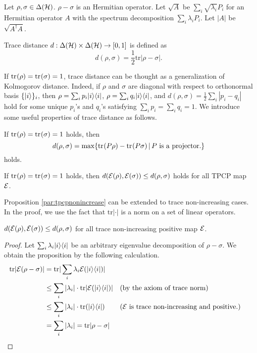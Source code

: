 Let $\rho, \sigma \in \Delta(\mathcal{H})$. $\rho - \sigma$ is an Hermitian
operator. Let $\sqrt{A}$ be $\sum_i \sqrt{\lambda_i}P_i$ for
an Hermitian operator $A$ with the spectrum decomposition
$\sum_i \lambda_i P_i$. Let $|A|$ be $\sqrt{A^\dagger A}$.

\begin{defi}
 Trace distance $d: \Delta(\mathcal{H}) \times \Delta(\mathcal{H}) \rightarrow [0,1]$ is
 defined as 
\[
 d(\rho, \sigma) = \frac{1}{2}\mathrm{tr}|\rho - \sigma|.
\]
\end{defi}
If ${\rm tr}_{}(\rho) = {\rm tr}_{}(\sigma) = 1$, trace distance can be thought as
a generalization of Kolmogorov distance.
Indeed, if $\rho$ and $\sigma$ are diagonal with respect to
orthonormal basis
$\{|i\rangle\}_{i}$, then $\rho = \sum_i p_i |i\rangle\langle i|$,
$\rho = \sum_i q_i |i\rangle\langle i|$, and $d(\rho,\sigma) = 
\frac{1}{2}\sum_i |p_i - q_i|$ hold for some unique $p_i$'s and $q_i$'s
satisfying $\sum_i p_i = \sum_i q_i = 1$.
We introduce some useful properties of trace distance as follows.

\begin{prop}
\label{par:trdismax}
 If ${\rm tr}_{}(\rho) = {\rm tr}_{}(\sigma) = 1$ holds, then 
\[
 d(\rho, \sigma) = 
 \max\{{\rm tr}_{}(P\rho) - {\rm tr}_{}(P\sigma)\,|\, P \mbox{ is a projector.}\}
\]
holds.
\end{prop}

\begin{prop}
\label{par:tpcpnonincrease}
If ${\rm tr}_{}(\rho) = {\rm tr}_{}(\sigma) = 1$ holds, then
 $d(\mathcal{E}(\rho), \mathcal{E}(\sigma))
\le d(\rho, \sigma)$ holds for all TPCP map $\mathcal{E}$.
\end{prop}
Proposition \ref{par:tpcpnonincrease}
can be extended to trace non-increasing cases.
In the proof, we use the fact that $\mathrm{tr}|\cdot|$ is a
norm on a set of linear operators.

\begin{prop}
\label{par:positivenonincrease}
 $d(\mathcal{E}(\rho), \mathcal{E}(\sigma)) \le d(\rho, \sigma)$ for all
 trace non-increasing positive map $\mathcal{E}$.
\end{prop}

\begin{proof}
 Let $\sum_i \lambda_i |i\rangle\langle i|$ be an arbitrary eigenvalue
 decomposition of $\rho - \sigma$. 
 We obtain the proposition by the following calculation.
 \begin{align*}
  \mathrm{tr}|\mathcal{E}(\rho - \sigma)|
  &= \mathrm{tr}|\sum_i \lambda_i \mathcal{E}(|i\rangle\langle i|)| \\
  &\le \sum_i |\lambda_i| \cdot \mathrm{tr}|\mathcal{E}(|i\rangle\langle i|)| 
  &&\mbox{(by the axiom of trace norm)}\\
  &\le \sum_i |\lambda_i| \cdot \mathrm{tr}(|i\rangle\langle i|)
  &&\mbox{(} \mathcal{E} \mbox{ is trace non-increasing and positive.)}\\
  &= \sum_i |\lambda_i| = \mathrm{tr}|\rho - \sigma|
 \end{align*}
\end{proof}

